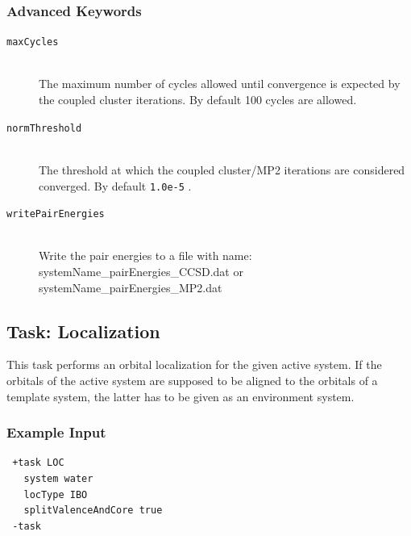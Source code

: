 \documentclass[bibliography=totocnumbered,a4paper,10pt,oneside]{scrbook}
\newcommand{\ttt}[1]{%
  \begingroup\setlength{\fboxsep}{1pt}%
  \colorbox{serenity-green!30}{\texttt{\hspace*{2pt}\vphantom{(g}#1\hspace*{2pt}}}%
  \endgroup
}
\begin{document}
\subsubsection{Advanced Keywords}
\begin{description}
  \item [\texttt{maxCycles}]\hfill \\
  The maximum number of cycles allowed until convergence is expected by the coupled cluster iterations.
  By default 100 cycles are allowed.
  \item [\texttt{normThreshold}]\hfill \\
  The threshold at which the coupled cluster/MP2 iterations are considered converged. By default \ttt{1.0e-5}.
  \item [\texttt{writePairEnergies}]\hfill \\
  Write the pair energies to a file with name: systemName\_pairEnergies\_CCSD.dat or systemName\_pairEnergies\_MP2.dat
\end{description}

\subsection{Task: Localization}\label{task:localization}
This task performs an orbital localization for the given active system. If the orbitals of
the active system are supposed to be aligned to the orbitals of a template system, the latter
has to be given as an environment system.

\subsubsection{Example Input}
\begin{lstlisting}
 +task LOC
   system water
   locType IBO
   splitValenceAndCore true
 -task
\end{lstlisting}
\end{document}
